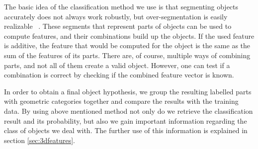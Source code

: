 The basic idea of the classification method we use is that
segmenting objects accurately does not always work
robustly, but over-segmentation is easily realizable ~\cite{soupofsegments,Lai_Fox_2010,mozos11furniture}.
These segments that represent parts of objects can be used
to compute features, and their combinations build up the
objects. If the used feature is additive, the feature that
would be computed for the object is the same as the sum
of the features of its parts.
There are, of course, multiple ways of combining parts,
and not all of them create a valid object. However, one can
test if a combination is correct by checking if the
combined feature vector is known. 

In order to obtain a final object hypothesis, we group the resulting labelled parts with geometric categories together and compare the results with the training data. By using above mentioned method not only do we retrieve the classification result and its probability, but also we gain important information regarding the class of objects we deal with. The further use of this information is explained in section \ref{sec:3dfeatures}.
















